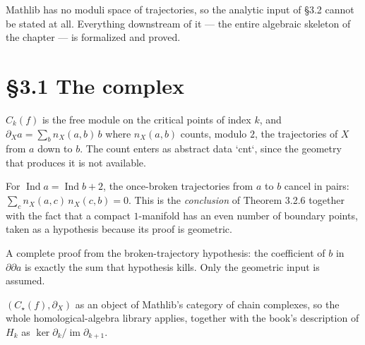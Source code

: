 Mathlib has no moduli space of trajectories, so the analytic input of \S3.2
cannot be stated at all.  Everything downstream of it --- the entire algebraic
skeleton of the chapter --- is formalized and proved.

\section{\S3.1 The complex}

\begin{definition}
  \label{def:3.1}
  \leanok
  $C_k(f)$ is the free module on the critical points of index $k$, and
  $\partial_X a = \sum_b n_X(a,b)\, b$ where $n_X(a,b)$ counts, modulo $2$, the
  trajectories of $X$ from $a$ down to $b$.  The count enters as abstract data
  `cnt`, since the geometry that produces it is not available.
\end{definition}

\begin{definition}
  \label{def:brokenPairs}
  \leanok
  For $\operatorname{Ind} a = \operatorname{Ind} b + 2$, the once-broken
  trajectories from $a$ to $b$ cancel in pairs:
  $\sum_c n_X(a,c)\,n_X(c,b) = 0$.  This is the \emph{conclusion} of
  Theorem 3.2.6 together with the fact that a compact $1$-manifold has an even
  number of boundary points, taken as a hypothesis because its proof is
  geometric.
\end{definition}

\begin{theorem}[$\partial_X\circ\partial_X = 0$, \S3.1.b]
  \label{thm:dd0}
  \leanok
  A complete proof from the broken-trajectory hypothesis: the coefficient of $b$
  in $\partial\partial a$ is exactly the sum that hypothesis kills.  Only the
  geometric input is assumed.
\end{theorem}

\begin{definition}
  \label{def:morseComplex}
  \leanok
  $(C_\star(f),\partial_X)$ as an object of Mathlib's category of chain
  complexes, so the whole homological-algebra library applies, together with the
  book's description of $H_k$ as $\ker\partial_k/\operatorname{im}\partial_{k+1}$.
\end{definition}

